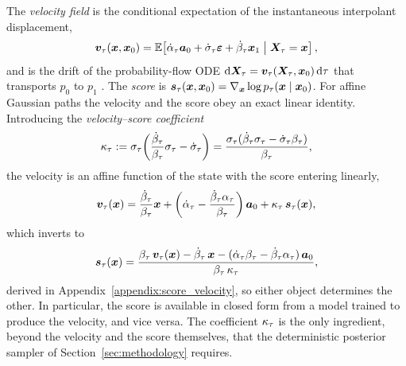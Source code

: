 The \emph{velocity field} is the conditional expectation of the instantaneous interpolant displacement,
\begin{align}\label{eq:general_velocity}
    \bm{v}_\tau(\boldsymbol{x},\boldsymbol{x}_0)
    = \mathbb{E}\!\left[\dot\alpha_\tau\bm{a}_0 + \dot{\sigma}_\tau\bm{\varepsilon} + \dot\beta_\tau\boldsymbol{x}_1 \;\middle|\; \boldsymbol{X}_\tau=\boldsymbol{x}\right],
\end{align}
and is the drift of the probability-flow ODE $\mathrm{d}\boldsymbol{X}_\tau = \bm{v}_\tau(\boldsymbol{X}_\tau,\boldsymbol{x}_0)\,\mathrm{d}\tau$ that transports $p_0$ to $p_1$ \cite{lipman_flow_2023, albergo_stochastic_2023}. The \emph{score} is $\bm{s}_\tau(\boldsymbol{x},\boldsymbol{x}_0) = \nabla_{\boldsymbol{x}}\log p_\tau(\boldsymbol{x}\mid\boldsymbol{x}_0)$. For affine Gaussian paths the velocity and the score obey an exact linear identity. Introducing the \emph{velocity--score coefficient}
\begin{align}\label{eq:vscoef_def}
    \kappa_\tau := \sigma_\tau\!\left(\frac{\dot\beta_\tau}{\beta_\tau}\sigma_\tau - \dot{\sigma}_\tau\right)
    = \frac{\sigma_\tau(\dot\beta_\tau\sigma_\tau - \dot{\sigma}_\tau\beta_\tau)}{\beta_\tau},
\end{align}
the velocity is an affine function of the state with the score entering linearly,
\begin{align}\label{eq:general_velocity_of_score}
    \bm{v}_\tau(\boldsymbol{x})
    = \frac{\dot\beta_\tau}{\beta_\tau}\boldsymbol{x}
    + \left(\dot\alpha_\tau - \frac{\dot\beta_\tau\alpha_\tau}{\beta_\tau}\right)\bm a_0
    + \kappa_\tau\,\bm{s}_\tau(\boldsymbol{x}),
\end{align}
which inverts to
\begin{align}\label{eq:general_score_velocity}
    \bm{s}_\tau(\boldsymbol{x})
    = \frac{\beta_\tau\,\bm{v}_\tau(\boldsymbol{x}) - \dot\beta_\tau\,\boldsymbol{x} - (\dot\alpha_\tau\beta_\tau - \dot\beta_\tau\alpha_\tau)\,\bm a_0}
           {\beta_\tau\,\kappa_\tau},
\end{align}
derived in Appendix~\ref{appendix:score_velocity}, so either object determines the other. In particular, the score is available in closed form from a model trained to produce the velocity, and vice versa. The coefficient $\kappa_\tau$ is the only ingredient, beyond the velocity and the score themselves, that the deterministic posterior sampler of Section~\ref{sec:methodology} requires.

